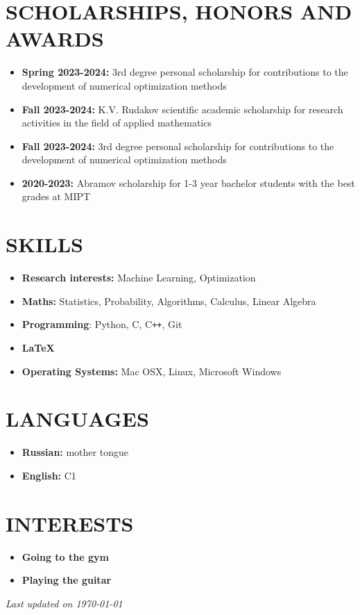 \documentclass[12pt]{moderncv}
\begin{document}
    \section{SCHOLARSHIPS, HONORS AND AWARDS}

        \begin{itemize}
            \item \textbf{Spring 2023-2024:} 3rd degree personal scholarship for contributions to the development of numerical optimization methods
            \item \textbf{Fall 2023-2024:} K.V. Rudakov scientific academic scholarship for research activities in the field of applied mathematics
            \item \textbf{Fall 2023-2024:} 3rd degree personal scholarship for contributions to the development of numerical optimization methods
            \item \textbf{2020-2023:} Abramov scholarship for 1-3 year bachelor students with the best grades at MIPT
        \end{itemize}

    \section{SKILLS}
    
        \begin{itemize}
            \item \textbf{Research interests:} Machine Learning, Optimization
            \item \textbf{Maths:} Statistics, Probability, Algorithms, Calculus, Linear Algebra
            \item \textbf{Programming}: Python, C, C\texttt{++}, Git
            \item \textbf{\LaTeX}
            \item \textbf{Operating Systems:} Mac OSX, Linux, Microsoft Windows
        \end{itemize}

    \section{LANGUAGES}

        \begin{itemize}
            \item \textbf{Russian:} mother tongue
            \item \textbf{English:} C1
        \end{itemize}

    \section{INTERESTS}

        \begin{itemize}
            \item \textbf{Going to the gym}
            \item \textbf{Playing the guitar}
        \end{itemize}

    \emptysection{}\closesection{}
    \begin{center}
    \textit{Last updated on \today}
    \end{center}
\end{document}

